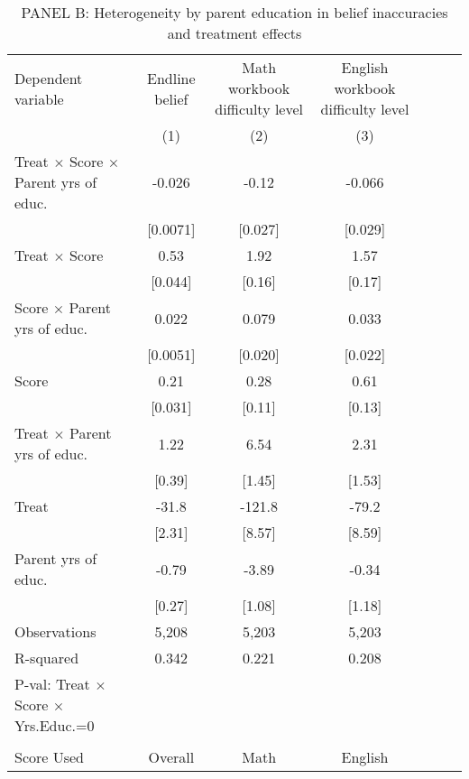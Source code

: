 \documentclass{article}
\begin{document}
\begin{table}[h!]\ContinuedFloat

    \centering
    \caption{PANEL B: Heterogeneity by parent education in belief inaccuracies and treatment effects}
    \begin{adjustbox}{width=\textwidth}
 \begin{tabular}{lcccccc}
\addlinespace
\toprule
Dependent variable & Endline belief & Math workbook difficulty level & English workbook difficulty level\\
 & (1) & (2) & (3) \\
\midrule

\addlinespace
Treat $\times$ Score $\times$ Parent yrs of educ.&      -0.026&       -0.12&      -0.066\\
                    &    [0.0071]&     [0.027]&     [0.029]\\
\addlinespace
Treat $\times$ Score&        0.53&        1.92&        1.57\\
                    &     [0.044]&      [0.16]&      [0.17]\\
\addlinespace
Score $\times$ Parent yrs of educ.&       0.022&       0.079&       0.033\\
                    &    [0.0051]&     [0.020]&     [0.022]\\
\addlinespace
Score               &        0.21&        0.28&        0.61\\
                    &     [0.031]&      [0.11]&      [0.13]\\
\addlinespace
Treat $\times$ Parent yrs of educ.&        1.22&        6.54&        2.31\\
                    &      [0.39]&      [1.45]&      [1.53]\\
\addlinespace
Treat               &       -31.8&      -121.8&       -79.2\\
                    &      [2.31]&      [8.57]&      [8.59]\\
\addlinespace
Parent yrs of educ. &       -0.79&       -3.89&       -0.34\\
                    &      [0.27]&      [1.08]&      [1.18]\\
\addlinespace
\addlinespace[2pt] Observations&       5,208&       5,203&       5,203\\
R-squared           &       0.342&       0.221&       0.208\\
P-val: Treat $\times$ Score $\times$ Yrs.Educ.=0&            &            &            \\
\\ Score Used       &     Overall&        Math&     English\\

\bottomrule        
\end{tabular}
\end{adjustbox}
\end{table}
\restoregeometry %
\end{document}
